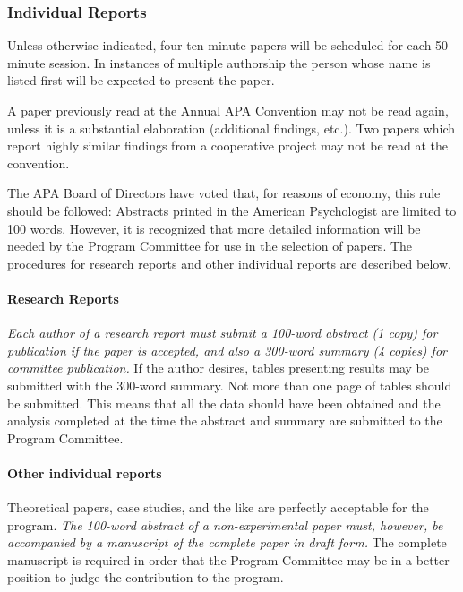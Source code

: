 \subsubsection{Individual Reports}
\label{individualreports}

Unless otherwise indicated, four ten-minute papers will be scheduled for each 50-minute session. In instances of multiple authorship the person whose name is listed first will be expected to present the paper.

A paper previously read at the Annual APA Convention may not be read again, unless it is a substantial elaboration (additional findings, etc.). Two papers which report highly similar findings from a cooperative project may not be read at the convention.

The APA Board of Directors have voted that, for reasons of economy, this rule should be followed: Abstracts printed in the American Psychologist are limited to 100 words. However, it is recognized that more detailed information will be needed by the Program Committee for use in the selection of papers. The procedures for research reports and other individual reports are described below.

\paragraph{Research Reports}
\label{researchreports}

\emph{Each author of a research report must submit a 100-word abstract (1 copy) for publication if the paper is accepted, and also a 300-word summary (4 copies) for committee publication.} If the author desires, tables presenting results may be submitted with the 300-word summary. Not more than one page of tables should be submitted. This means that all the data should have been obtained and the analysis completed at the time the abstract and summary are submitted to the Program Committee.

\paragraph{Other individual reports}
\label{otherindividualreports}

Theoretical papers, case studies, and the like are perfectly acceptable for the program. \emph{The 100-word abstract of a non-experimental paper must, however, be accompanied by a manuscript of the complete paper in draft form.} The complete manuscript is required in order that the Program Committee may be in a better position to judge the contribution to the program.

